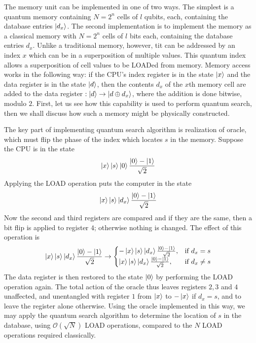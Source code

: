 The memory unit can be implemented in one of two ways. The simplest is a quantum memory containing $N=2^n$ cells of $l$ qubits, each, containing the database entries $\ket{d_x}$. The second implementation is to implement the memory as a classical memory with $N=2^n$ cells of $l$ bits each, containing the database entries $d_x$. Unlike a traditional memory, however, tit can be addressed by an index $x$ which can be in a superposition of multiple values. This quantum index allows a superposition of cell values to be LOADed from memory. Memory access works in the following way: if the CPU's index register is in the state $\ket{x}$ and the data register is in the state $\ket{d}$, then the contents $d_x$ of the $x$th memory cell are added to the data register $:\ket{d} \rightarrow \ket{d \oplus d_x}$, where the addition is done bitwise, modulo $2$. First, let us see how this capability is used to perform quantum search, then we shall discuss how such a memory might be physically constructed.

The key part of implementing quantum search algorithm is realization of oracle, which must flip the phase of the index which locates $s$ in the memory. Suppose the CPU is in the state 
\[
\ket{x}\ket{s}\ket{0}\frac{\ket{0}-\ket{1}}{\sqrt{2}}
\]
Applying the LOAD operation puts the computer in the state
\[
\ket{x}\ket{s}\ket{d_x}\frac{\ket{0}-\ket{1}}{\sqrt{2}}
\]
Now the second and third registers are compared and if they are the same, then a bit flip is applied to register $4$; otherwise nothing is changed. The effect of this operation is 
\[
\ket{x}\ket{s}\ket{d_x}\frac{\ket{0}-\ket{1}}{\sqrt{2}}\rightarrow \begin{cases} -\ket{x}\ket{s}\ket{d_x}\frac{\ket{0}-\ket{1}}{\sqrt{2}}, &\text{if $d_x=s$}\\
\ket{x}\ket{s}\ket{d_x}\frac{\ket{0}-\ket{1}}{\sqrt{2}}, & \text{if $d_x\neq s$} \end{cases}
\]
The data register is then restored to the state $\ket{0}$ by performing the LOAD operation again. The total action of the oracle thus leaves registers $2,3$ and $4$ unaffected, and unentangled with register $1$ from $\ket{x}$ to $-\ket{x}$ if $d_x=s$, and to leave the register alone otherwise. Using the oracle implemented in this way, we may apply the quantum search algorithm to determine the location of $s$ in the database, using $\mathcal{O}(\sqrt{N})$ LOAD operations, compared to the $N$ LOAD operations required classically.

